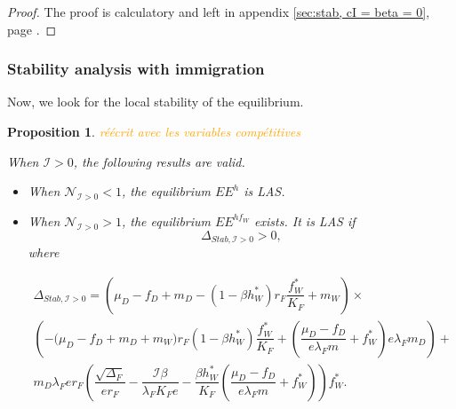 \documentclass{article}
\newcommand{\lfw}{\lambda_{F}}
\newcommand{\lfw}{\lambda_{F}}
\newcommand{\cI}{\mathcal{I}}
\newcommand{\vdeux}[1]{\textcolor{orange}{#1}}
\newtheorem{prop}[theorem]{Proposition}
\theoremstyle{definition}
\theoremstyle{remark}
\begin{document}
\begin{proof}
The proof is calculatory and left in appendix \ref{sec:stab, cI = beta = 0}, page \pageref{sec:stab, cI = beta = 0}.
\end{proof}


\subsubsection{Stability analysis with immigration}
Now, we look for the local stability of the equilibrium.
\begin{prop}\label{prop:stab, cI>0} 
\vdeux{réécrit avec les variables compétitives}

When $\cI > 0$, the following results are valid.
\begin{itemize}
\item When $\mathcal{N}_{\cI > 0} < 1$, the equilibrium $EE^{h}$ is LAS.
\item When $\mathcal{N}_{\cI > 0} > 1$, the equilibrium $EE^{hf_W}$  exists. It is LAS if 
$$\Delta_{Stab, \cI > 0} > 0,$$  where 

\begin{multline*}
\Delta_{Stab, \cI > 0} = \left(\mu_D -f_D + m_D - (1 - \beta h_W^*)r_F \dfrac{f_W^*}{K_F} + m_W  \right) \times \\ \left(- \big( \mu_D  -f_D + m_D + m_W) r_F(1 - \beta h_W^*) \dfrac{f^*_W}{K_F} + \left(\dfrac{\mu_D -f_D}{e\lfw m} + f_W^*\right) e \lfw m_D \right) + \\
m_D \lfw e r_F \left(\dfrac{\sqrt{\Delta_F}}{er_F} - \dfrac{\cI \beta}{\lfw K_F e} - \dfrac{\beta h_W^*}{K_F} \left(\dfrac{\mu_D -f_D }{e \lfw m} + f_W^*\right)\right)  f^*_{W}.
\end{multline*}
\end{itemize}
\end{prop}
\end{document}
